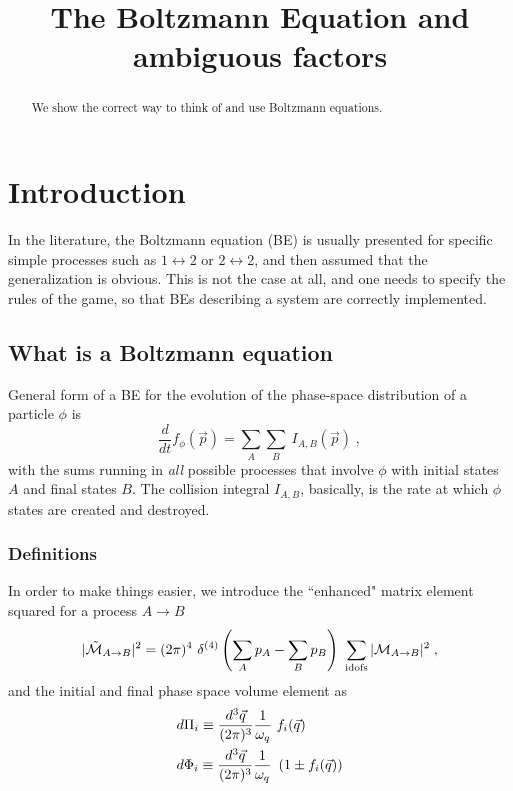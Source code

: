 \documentclass[11pt,a4paper]{article}
\author{}
\title{The Boltzmann Equation and ambiguous factors}
\begin{document}
\maketitle
\begin{abstract} 
We show the correct way to think of and use Boltzmann equations. 
\end{abstract}
\flushbottom

\section{Introduction}\label{sec:intro}
\setcounter{equation}{0}
%
In the literature, the Boltzmann equation (BE) is usually presented for specific simple processes such as $1 \leftrightarrow 2$ or  $2 \leftrightarrow 2$, and then assumed that the generalization is obvious. This is not the case at all, and one needs to specify the rules of the game, so that  BEs describing a system  are correctly implemented.

\subsection{What is a Boltzmann equation}
General form of a BE for the evolution of the phase-space distribution of a particle $\phi$ is 
%
\begin{equation}
\dfrac{d}{dt} f_{\phi} (\vec{p}) = \sum_{A} \sum_{B} \ I_{A,B}(\vec{p}) \;, 
\label{eq:GeneralBE}
\end{equation}
%
with the sums running in {\em all} possible processes that involve $\phi$ with initial states $A$ and final states $B$. The collision integral $I_{A,B}$, basically, is the rate at which $\phi$ states are created and destroyed.


\subsubsection*{Definitions}
In order to make things easier, we introduce the ``enhanced" matrix element squared for a process $A \to B$ 
%
\begin{equation}
 |\tilde{ \mathcal{M} }_{A \to B}|^2 = (2\pi)^4 \ \delta^{(4)}\left( \sum_A p_A - \sum_B p_B \right)  \  \sum_{\rm idofs}|\mathcal{M}_{A \to B}|^2 \; ,
\label{eq:tildeM}
\end{equation}
%
and the initial and final phase space volume element as 
%
\begin{eqnarray}
&d \Pi_i  \equiv \dfrac{d^3 \vec{q}}{ (2 \pi)^3 } \dfrac{1}{\omega_q} \ f_{i}(\vec{q}) \nonumber \\ 
&d \Phi_i  \equiv \dfrac{d^3 \vec{q}}{ (2 \pi)^3 } \dfrac{1}{\omega_q} \ \left( 1 \pm f_{i}(\vec{q}) \right)
\label{eq:PhaseSpaceVolume}
\end{eqnarray}
% 
\end{document}
